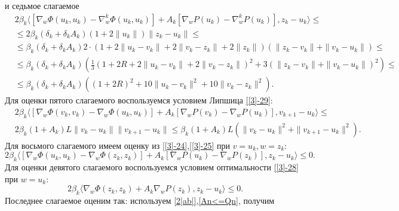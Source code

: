 и седьмое слагаемое
\begin{equation}
\label{[3]-43}
\begin{aligned}
&2\beta_k\big\langle [\nabla_w\Phi(u_k,u_k)-\nabla_w^k\Phi(u_k,u_k)]+A_k[\nabla_wP(u_k)-\nabla_w^kP(u_k)],z_k-u_k\big\rangle\leqslant\\
&\leqslant 2\beta_k(\delta_k+\delta_kA_k)(1+2\|u_k\|)\|z_k-u_k\|\leqslant\\
&\leqslant \beta_k (\delta_k+\delta_kA_k)2\cdot(1+2\|u_k-v_k\|+2\|v_k-z_k\|+2\|z_k\|)(\|z_k-v_k\|+\|v_k-u_k\|)\leqslant\\
&\leqslant\beta_k (\delta_k+\delta_kA_k)(\frac{1}{3}(1+2R+2\|u_k-v_k\|+2\|v_k-z_k\|)^2+3(\|z_k-v_k\|+\|v_k-u_k\|)^2)\leqslant\\
&\leqslant\beta_k (\delta_k+\delta_kA_k)((1+2R)^2+10\|u_k-v_k\|^2+10\|v_k-z_k\|^2).
\end{aligned}
\end{equation}
Для оценки пятого слагаемого воспользуемся условием Липшица \eqref{[3]-29}:
\begin{equation}
\label{[3]-44}
\begin{aligned}
&2\beta_k\big\langle [\nabla_w\Phi(v_k,v_k)-\nabla_w\Phi(u_k,u_k)]+A_k[\nabla_wP(v_k)-\nabla_wP(u_k)],v_{k+1}-u_k\big\rangle\leqslant\\
&2\beta_k(1+A_k)L\|v_k-u_k\|\|v_{k+1}-u_k\|\leqslant\beta_k(1+A_k)L(\|v_k-u_k\|^2+\|v_{k+1}-u_k\|^2).
\end{aligned}
\end{equation}
Для восьмого слагаемого имеем оценку из \eqref{[3]-24},\eqref{[3]-25} при $v=u_k,w=z_k$:
\begin{equation}
\label{[3]-45}
2\beta_k\big\langle [\nabla_w\Phi(u_k,u_k)-\nabla_w\Phi(z_k,z_k)]+A_k[\nabla_wP(u_k)-\nabla_wP(z_k)],z_k-u_k\big\rangle\leqslant 0.
\end{equation}
Для оценки девятого слагаемого воспользуемся условием оптимальности \eqref{[3]-28} при $w=u_k$:
\begin{equation}
\label{[3]-46}
2\beta_k\big\langle \nabla_w\Phi(z_k,z_k)+A_k\nabla_wP(z_k),z_k-u_k\big\rangle\leqslant 0.
\end{equation}
Последнее слагаемое оценим так: используем \eqref{2|ab|},\eqref{An<=Qn}, получим
